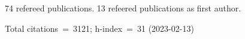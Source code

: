 74 refereed publications. 13 refeered publications as first author.

Total citations~=~3121; h-index~=~31 (2023-02-13)